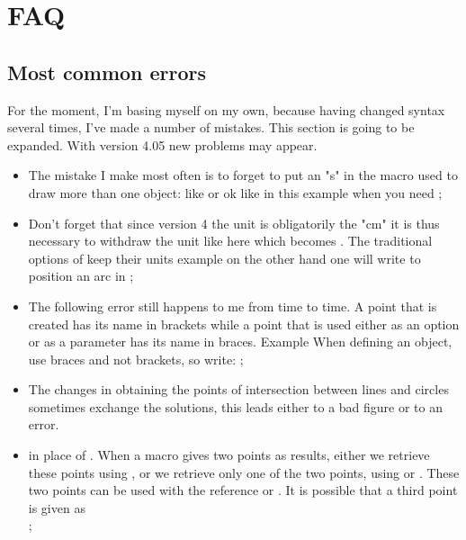 \section{FAQ} 

\subsection{Most common errors}
 For the moment, I'm basing myself on my own, because having changed syntax several times, I've made a number of mistakes. This section is going to be expanded. With version 4.05 new problems may appear.
 
\begin{itemize}\setlength{\itemsep}{10pt}
  \item The mistake I make most often is to forget to put an "s" in the macro used to draw more than one object: like  or  ok like in this example  when you need  ;
  
  \item Don't forget that since version 4 the unit is obligatorily the "cm" it is thus necessary to withdraw the unit like here  which becomes . The traditional options of  keep their units example on the other hand one will write  to position an arc in ;
  
  \item The following error still happens to me from time to time. A point that is created has its name in brackets while a point that is used either as an option or as a parameter has its name in braces. Example  When defining an object, use braces and not brackets, so write: ;
  
  \item The changes in obtaining the points of intersection between lines and circles sometimes exchange the solutions, this leads either to a bad figure or to an error.
  
  \item {} in place of . When a macro gives two points as results, either we retrieve these points using , or we retrieve only one of the two points, using  or 
  . These two points can be used with the reference  or 
  . It is possible that a third point is given as\\ ;


\end{itemize}

